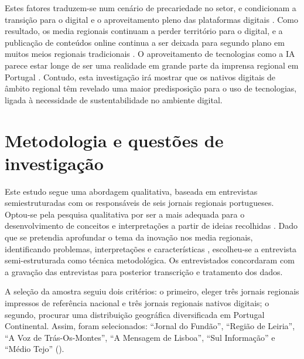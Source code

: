 \documentclass[portuguese]{textolivre}
\begin{document}
Estes fatores traduzem-se num cenário de precariedade no setor, e
condicionam a transição para o digital e o aproveitamento pleno das
plataformas digitais \cite{Alves2020}. Como resultado, os media
regionais continuam a perder território para o digital, e a publicação
de conteúdos online continua a ser deixada para segundo plano em muitos
meios regionais tradicionais \cite{Quintanilha2018,Alves2020}. O aproveitamento de tecnologias como a IA parece estar
longe de ser uma realidade em grande parte da imprensa regional em
Portugal \cite{Goncalves2024}. Contudo, esta investigação irá mostrar
que os nativos digitais de âmbito regional têm revelado uma maior
predisposição para o uso de tecnologias, ligada à necessidade de
sustentabilidade no ambiente digital.

\section{Metodologia e questões de investigação}

Este estudo segue uma abordagem qualitativa, baseada em entrevistas
semiestruturadas com os responsáveis de seis jornais regionais
portugueses. Optou-se pela pesquisa qualitativa por ser a mais adequada
para o desenvolvimento de conceitos e interpretações a partir de ideias
recolhidas \cite{Soares2019}. Dado que se pretendia aprofundar o tema
da inovação nos media regionais, identificando problemas, interpretações
e características \cite{Duarte2005,bauer2008social}, escolheu-se a
entrevista semi-estruturada como técnica metodológica. Os entrevistados
concordaram com a gravação das entrevistas para posterior transcrição e
tratamento dos dados.

A seleção da amostra seguiu dois critérios: o primeiro, eleger três
jornais regionais impressos de referência nacional e três jornais
regionais nativos digitais; o segundo, procurar uma distribuição
geográfica diversificada em Portugal Continental. Assim, foram
selecionados: ``Jornal do Fundão'', ``Região de Leiria'', ``A Voz de
Trás-Os-Montes'', ``A Mensagem de Lisboa'', ``Sul Informação'' e ``Médio
Tejo'' ().
\end{document}
